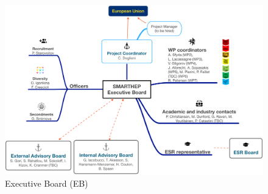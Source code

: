 \begin{figure}
\begin{center}
\includegraphics[width=\textwidth]{figs/SMARTHEP_Boards.png} %
\caption{\acronym Executive Board (EB)}
\label{fig:management}
\end{center}
\vspace{-5mm}
\end{figure}



